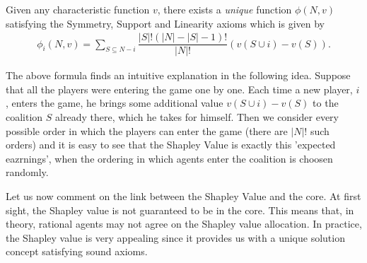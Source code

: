 \begin{theorem}
Given any characteristic function $v$, there exists a \emph{unique} function $\phi(N,v)$ satisfying the Symmetry, Support and Linearity axioms which is given by
\begin{align*}
	\phi_i(N,v) = \sum_{S \subseteq N -i}{\dfrac{|S|!(|N| - |S| - 1)!}{|N|!} (v(S \cup {i}) - v(S))}.
\end{align*}
\end{theorem}


The above formula finds an intuitive explanation in the following idea. Suppose that all the players were entering the game one by one. Each time a new player, $i$, enters the game, he brings some additional value $v(S \cup {i}) - v(S)$ to the coalition $S$ already there, which he takes for himself. Then we consider every possible order in which the players can enter the game (there are $|N|!$ such orders) and it is easy to see that the Shapley Value is exactly this 'expected eazrnings', when the ordering in which agents enter the coalition is choosen randomly.

Let us now comment on the link between the Shapley Value and the core.
At first sight, the Shapley value is not guaranteed to be in the core. This means that, in theory, rational agents may not agree on the Shapley value allocation. In practice, the Shapley value is very appealing since it provides us with a unique solution concept satisfying sound axioms.

